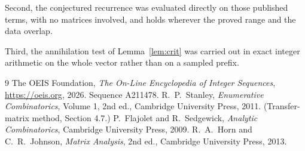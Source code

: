 \documentclass[11pt,a4paper]{article}
\theoremstyle{plain}
\theoremstyle{definition}
\begin{document}
Second, the conjectured recurrence was evaluated directly on those published terms, with no
matrices involved, and holds wherever the proved range and the data overlap.

Third, the annihilation test of Lemma~\ref{lem:crit} was carried out in exact integer
arithmetic on the whole vector rather than on a sampled prefix.

\begin{thebibliography}{9}
 The OEIS Foundation, \emph{The On-Line Encyclopedia of Integer
Sequences}, \url{https://oeis.org}, 2026. Sequence A211478.
 R.~P.~Stanley, \emph{Enumerative Combinatorics}, Volume 1, 2nd ed.,
Cambridge University Press, 2011. (Transfer-matrix method, Section 4.7.)
 P.~Flajolet and R.~Sedgewick, \emph{Analytic Combinatorics}, Cambridge
University Press, 2009.
 R.~A.~Horn and C.~R.~Johnson, \emph{Matrix Analysis}, 2nd ed., Cambridge
University Press, 2013.
\end{thebibliography}
\end{document}
